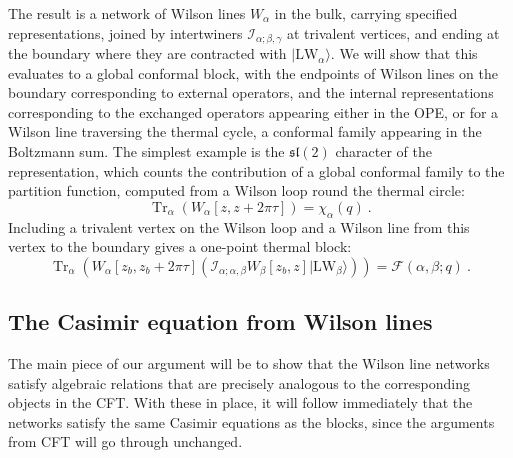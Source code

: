 \documentclass[12pt]{article}
\newcommand{\lie}[1]{\mathfrak{#1}}
\DeclareMathOperator{\Tr}{Tr}
\newcommand{\intertwine}[3]{\mathcal{I}_{#1;#2,#3}}
\newcommand{\lw}[1]{|\text{LW}_{#1}\rangle}
\begin{document}
The result is a network of Wilson lines $W_\alpha$ in the bulk, carrying specified representations, joined by intertwiners $\intertwine{\alpha}{\beta}{\gamma}$ at trivalent vertices, and ending at the boundary where they are contracted with $\lw{\alpha}$. We will show that this evaluates to a global conformal block, with the endpoints of Wilson lines on the boundary corresponding to external operators, and the internal representations corresponding to the exchanged operators appearing either in the OPE, or for a Wilson line traversing the thermal cycle, a conformal family appearing in the Boltzmann sum. The simplest example is the $\lie{sl}(2)$ character of the representation, which counts the contribution of a global conformal family to the partition function, computed from a Wilson loop round the thermal circle:
\begin{equation}
	\Tr_\alpha\left(W_\alpha[z,z+2\pi\tau]\right)=\chi_\alpha(q)~.
\end{equation}
 Including a trivalent vertex on the Wilson loop and a Wilson line from this vertex to the boundary gives a one-point thermal block:
\begin{equation}
	\Tr_\alpha\left(W_\alpha[z_b,z_b+2\pi\tau](\intertwine{\alpha}{\alpha}{\beta}W_\beta[z_b,z]\lw{\beta}) \right)=\mathcal{F}(\alpha,\beta;q)~.
\end{equation}



\subsection{The Casimir equation from Wilson lines}

The main piece of our argument will be to show that the Wilson line networks satisfy algebraic relations that are precisely analogous to the corresponding objects in the CFT. With these in place, it will follow immediately that the networks satisfy the same Casimir equations as the blocks, since the arguments from CFT will go through unchanged.
\end{document}
